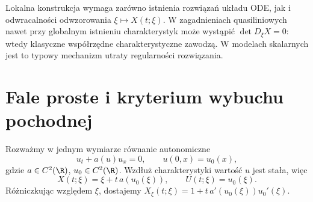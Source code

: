 \begin{uwaga}
Lokalna konstrukcja wymaga zarówno istnienia rozwiązań
układu ODE, jak i odwracalności odwzorowania $\xi\mapsto X(t;\xi)$.
W zagadnieniach quasiliniowych nawet przy globalnym
istnieniu charakterystyk może wystąpić
$\det D_\xi X=0$: wtedy klasyczne współrzędne
charakterystyczne zawodzą. W modelach skalarnych jest
to typowy mechanizm utraty regularności rozwiązania.
\end{uwaga}

\section{Fale proste i kryterium wybuchu pochodnej}
\label{sec:pde2-blowup}

Rozważmy w jednym wymiarze równanie autonomiczne
\begin{equation}\label{eq:pde2-simplewave}
 u_t+a(u)u_x=0,\qquad u(0,x)=u_0(x),
\end{equation}
gdzie $a\in C^2(\R)$, $u_0\in C^2(\R)$.
Wzdłuż charakterystyki wartość $u$ jest stała, więc
\begin{equation}\label{eq:pde2-simplewave-map}
 X(t;\xi)=\xi+t\,a(u_0(\xi)),\qquad
 U(t;\xi)=u_0(\xi).
\end{equation}
Różniczkując względem $\xi$, dostajemy
$X_\xi(t;\xi)=1+t\,a'(u_0(\xi))u_0'(\xi)$.

